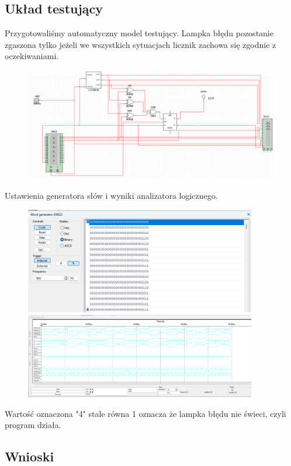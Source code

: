 \documentclass{article}
\begin{document}
\subsection{Układ testujący}
Przygotowaliśmy automatyczny model testujący. Lampka błędu pozostanie zgaszona tylko jeżeli we wszystkich sytuacjach licznik zachowa się zgodnie z oczekiwaniami.
\begin{figure}[H]
\includegraphics[width = \textwidth]{3a_tester}
\end{figure}
Ustawienia generatora słów i wyniki analizatora logicznego.
\begin{figure}[H]
\includegraphics[width = 0.9\textwidth]{3a_generator}
\includegraphics[width = 0.9\textwidth]{3a_analizer}
\end{figure}
Wartość oznaczona "4" stale równa 1 oznacza że lampka błędu nie świeci, czyli program działa.
\subsection{Wnioski}
\end{document}
